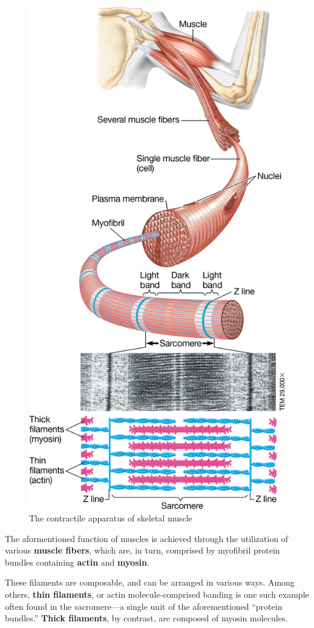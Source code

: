 \documentclass{article}
\begin{document}
\begin{figure}
  \centering
  \includegraphics[width=\linewidth]{muscle_fiber.png}
  \caption{The contractile apparatus of skeletal muscle}
\end{figure}

The aformentioned function of muscles is achieved through the utilization of
various \textbf{muscle fibers}, which are, in turn, comprised by myofibril
protein bundles containing \textbf{actin} and \textbf{myosin}.

These filaments are composable, and can be arranged in various ways. Among
others, \textbf{thin filaments}, or actin molecule-comprised banding is one such
example often found in the sacromere---a single unit of the aforementioned
``protein bundles.'' \textbf{Thick filaments}, by contrast, are composed of
myosin molecules.
\end{document}
